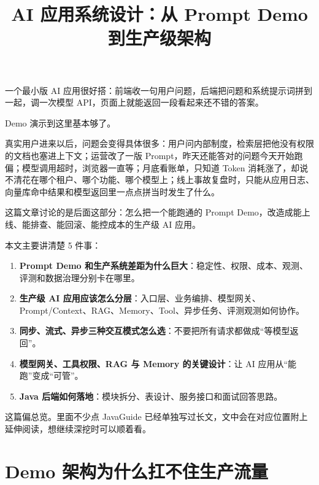 \documentclass[10pt,a4paper]{ctexart}
\begin{document}
\title{AI 应用系统设计：从 Prompt Demo 到生产级架构}
\date{}
\maketitle

一个最小版 AI 应用很好搭：前端收一句用户问题，后端把问题和系统提示词拼到一起，调一次模型 API，页面上就能返回一段看起来还不错的答案。



Demo 演示到这里基本够了。



真实用户进来以后，问题会变得具体很多：用户问内部制度，检索层把他没有权限的文档也塞进上下文；运营改了一版 Prompt，昨天还能答对的问题今天开始跑偏；模型调用超时，浏览器一直等；月底看账单，只知道 Token 消耗涨了，却说不清花在哪个租户、哪个功能、哪个模型上；线上事故复盘时，只能从应用日志、向量库命中结果和模型返回里一点点拼当时发生了什么。



这篇文章讨论的是后面这部分：怎么把一个能跑通的 Prompt Demo，改造成能上线、能排查、能回滚、能控成本的生产级 AI 应用。



本文主要讲清楚 5 件事：


\begin{enumerate}[itemsep=2pt, topsep=4pt]
  \item \textbf{Prompt Demo 和生产系统差距为什么巨大}：稳定性、权限、成本、观测、评测和数据治理分别卡在哪里。
  \item \textbf{生产级 AI 应用应该怎么分层}：入口层、业务编排、模型网关、Prompt/Context、RAG、Memory、Tool、异步任务、评测观测如何协作。
  \item \textbf{同步、流式、异步三种交互模式怎么选}：不要把所有请求都做成“等模型返回”。
  \item \textbf{模型网关、工具权限、RAG 与 Memory 的关键设计}：让 AI 应用从“能跑”变成“可管”。
  \item \textbf{Java 后端如何落地}：模块拆分、表设计、服务接口和面试回答思路。
\end{enumerate}


这篇偏总览。里面不少点 JavaGuide 已经单独写过长文，文中会在对应位置附上延伸阅读，想继续深挖时可以顺着看。



\section{Demo 架构为什么扛不住生产流量}
\end{document}
